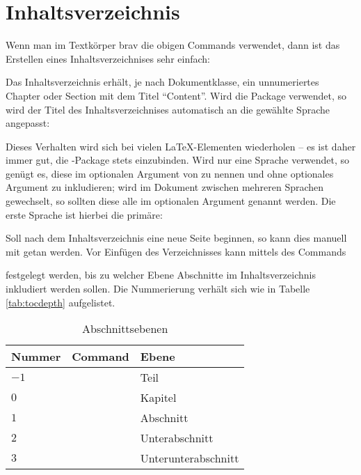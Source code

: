 \section{Inhaltsverzeichnis}
Wenn man im Textkörper brav die obigen Commands verwendet, dann ist das Erstellen eines Inhaltsverzeichnises sehr einfach:
\begin{latexlisting}
	\tableofcontents
\end{latexlisting}
Das Inhaltsverzeichnis erhält, je nach Dokumentklasse, ein unnumeriertes Chapter oder Section mit dem Titel \enquote{Content}.
Wird die Package  verwendet, so wird der Titel des Inhaltsverzeichnises automatisch an die gewählte Sprache angepasst:
\begin{latexlisting}
	\usepackage[ngerman]{babel}
\end{latexlisting}
Dieses Verhalten wird sich bei vielen \LaTeX -Elementen wiederholen -- es ist daher immer gut, die -Package stets einzubinden.
Wird nur eine Sprache verwendet, so genügt es, diese im optionalen Argument von  zu nennen und  ohne optionales Argument zu inkludieren; wird im Dokument zwischen mehreren Sprachen gewechselt, so sollten diese alle im optionalen Argument genannt werden.
Die erste Sprache ist hierbei die primäre:

Soll nach dem Inhaltsverzeichnis eine neue Seite beginnen, so kann dies manuell mit  getan werden.
Vor Einfügen des Verzeichnisses kann mittels des Commands
\begin{latexlisting}
	\setcounter{tocdepth}{3}
\end{latexlisting}
festgelegt werden, bis zu welcher Ebene Abschnitte im Inhaltsverzeichnis inkludiert werden sollen.
Die Nummerierung verhält sich wie in Tabelle \autoref{tab:tocdepth} aufgelistet.

\begin{table}
	\begin{tabular}{l p{5cm} p{5cm}}
		\toprule
		\textbf{Nummer} & \textbf{Command} & \textbf{Ebene} \tabularnewline
		\midrule
		$-1$ &
		 &
		 Teil
		\tabularnewline
		$0$ &
		 &
		Kapitel
		\tabularnewline
		$1$ &
		 &
		Abschnitt
		\tabularnewline
		$2$ &
		 &
		Unterabschnitt
		\tabularnewline
		$3$ &
		 &
		Unterunterabschnitt
		\tabularnewline
		\bottomrule
	\end{tabular}
	\caption{Abschnittsebenen}
	\label{tab:tocdepth}
\end{table}

